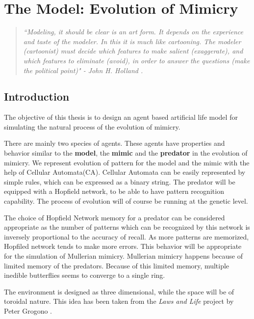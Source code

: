 \chapter{The Model: Evolution of Mimicry}

\begin{quote}
\textsl{``Modeling, it should be clear is an art form. It depends on the experience and taste of the modeler. In this it is much like cartooning. The modeler (cartoonist) must decide which features to make salient (exaggerate), and which features to eliminate (avoid), in order to answer the questions (make the political point)" - John H. Holland \cite{holland1996}.}
\end{quote}

\section{Introduction}
The objective of this thesis is to design an agent based artificial life model for simulating the natural process of the evolution of mimicry.

There are mainly two species of agents. These agents have properties and behavior similar to the \textbf{model}, the \textbf{mimic} and the \textbf{predator} in the evolution of mimicry. We represent evolution of pattern for the model and the mimic with the help of Cellular Automata(CA). Cellular Automata can be easily represented by simple rules, which can be expressed as a binary string. The predator will be equipped with a Hopfield network, to be able to have pattern recognition capability. The process of evolution will of course be running at the genetic level. 

The choice of Hopfield Network memory for a predator can be considered appropriate as the number of patterns which can be recognized by this network is inversely proportional to the accuracy of recall. As more patterns are memorized, Hopfiled network tends to make more errors. This behavior will be appropriate for the simulation of Mullerian mimicry. Mullerian mimicry happens because of limited memory of the predators. Because of this limited memory, multiple inedible butterflies seems to converge to a single ring.

The environment is designed as three dimensional, while the space will be of toroidal nature. This idea has been taken from the \textsl{Laws and Life} project by Peter Grogono \cite{grogono2003}.

